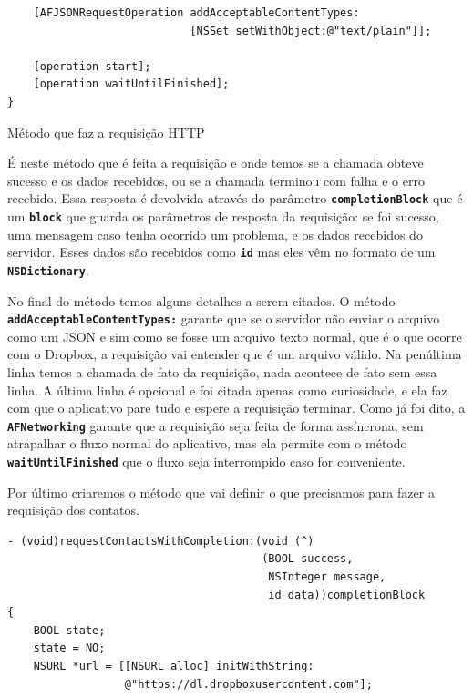 \documentclass[a4paper,12pt,brazil,doubleside]{book}
\begin{document}
\begin{singlespace}
\begin{listing}[H]
\begin{verbatim}
    [AFJSONRequestOperation addAcceptableContentTypes:
                            [NSSet setWithObject:@"text/plain"]];
    
    [operation start];
    [operation waitUntilFinished];
}
\end{verbatim}
\caption{Método que faz a requisição HTTP}
\end{listing}


É neste método que é feita a requisição e onde temos se a chamada obteve sucesso e os dados recebidos, ou se a chamada terminou com falha e o erro recebido. Essa resposta é devolvida através do parâmetro \texttt{\textbf{completionBlock}} que é um \texttt{\textbf{block}} que guarda os parâmetros de resposta da requisição: se foi sucesso, uma mensagem caso tenha ocorrido um problema, e os dados recebidos do servidor. Esses dados são recebidos como \texttt{\textbf{id}} mas eles vêm no formato de um \texttt{\textbf{NSDictionary}}.

No final do método temos alguns detalhes a serem citados. O método\\ \texttt{\textbf{addAcceptableContentTypes:}} garante que se o servidor não enviar o arquivo como um JSON e sim como se fosse um arquivo texto normal, que é o que ocorre com o Dropbox, a requisição vai entender que é um arquivo válido. Na penúltima linha temos a chamada de fato da requisição, nada acontece de fato sem essa linha. A última linha é opcional e foi citada apenas como curiosidade, e ela faz com que o aplicativo pare tudo e espere a requisição terminar. Como já foi dito, a \texttt{\textbf{AFNetworking}} garante que a requisição seja feita de forma assíncrona, sem atrapalhar o fluxo normal do aplicativo, mas ela permite com o método \texttt{\textbf{waitUntilFinished}} que o fluxo seja interrompido caso for conveniente.

Por último criaremos o método que vai definir o que precisamos para fazer a requisição dos contatos.

\begin{listing}[H]
\begin{verbatim}
- (void)requestContactsWithCompletion:(void (^)
                                       (BOOL success,
                                        NSInteger message,
                                        id data))completionBlock
{
    BOOL state;
    state = NO;
    NSURL *url = [[NSURL alloc] initWithString:
                  @"https://dl.dropboxusercontent.com"];
    

\end{verbatim}
\end{listing}
\end{singlespace}
\end{document}
